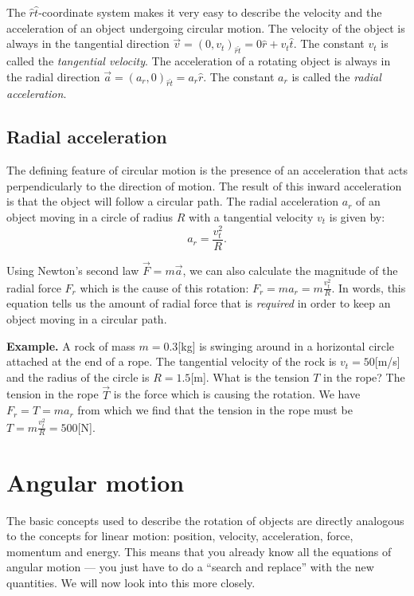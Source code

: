 \documentclass[letterpaper,9pt,journal]{IEEEtran}
\newcommand{\be}{\begin{equation}}
\newcommand{\ee}{\end{equation}}
\begin{document}
The $\hat{r}\hat{t}$-coordinate system makes it very easy 
to describe the velocity and the acceleration of an object undergoing circular motion.
The velocity of the object is always in the tangential direction $\vec{v} =(0,v_t)_{\hat{r}\hat{t}}= 0\hat{r}+v_t \hat{t}$.
The constant $v_t$ is called the \emph{tangential velocity}. 
The acceleration of a rotating object is always in the radial direction 
$\vec{a}=(a_r,0)_{\hat{r}\hat{t}} = a_r \hat{r}$.
The constant $a_r$ is called the \emph{radial acceleration}.

\vspace{-3mm}
\subsection{Radial acceleration}

The defining feature of circular motion is the presence of an acceleration
that acts perpendicularly to the direction of motion.
The result of this inward acceleration is that the object will follow a circular path.
The radial acceleration $a_r$ of an object moving in a circle of radius $R$
with a tangential velocity $v_t$ is given by:
\be
  a_r = \frac{v^2_t}{ R }.
  \label{RADIALa}
\ee

Using Newton's second law $\vec{F}=m\vec{a}$, we can also calculate the magnitude of the 
radial force $F_r$ which is the cause of this rotation: $F_{r} = ma_r = m \frac{v^2_t}{ R }$.
In words, this equation tells us the amount of radial force that is \emph{required} in order to keep an object moving
in a circular path. 

{\bf Example. }  A rock of mass $m=0.3$[kg] is swinging around in a horizontal circle attached at the end of a rope.
The tangential velocity of the rock is $v_t=50$[m/s] and the radius of the circle is $R=1.5$[m].
What is the tension $T$ in the rope?   The tension in the rope $\vec{T}$ is the force which is causing 
the rotation. We have $F_r =T = ma_r$ from which we find that the tension in the rope must be $T=m \frac{v^2_t}{ R }=500$[N].





\section{Angular motion}
\label{sec:angular-motion}

The basic concepts used to describe the rotation of objects %
are directly analogous to the concepts for linear motion:
position, velocity, acceleration, force, momentum and energy.
This means that you already know all the equations of angular motion --- 
you just have to do a ``search and replace'' with the new quantities.
We will now look into this more closely.
\end{document}
